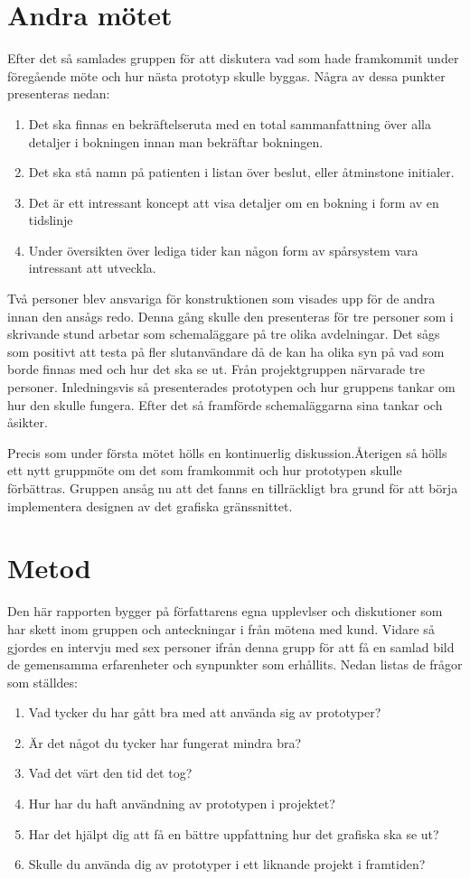 \section{Andra mötet}
Efter det  så samlades gruppen för att diskutera vad som hade framkommit under föregående möte och hur nästa prototyp skulle byggas. Några av dessa punkter  presenteras nedan:
\begin{enumerate}
	\item Det ska finnas en bekräftelseruta med en total sammanfattning över alla detaljer i bokningen innan man 	 			  	  bekräftar bokningen.
 	\item Det ska stå namn på patienten i listan över beslut, eller åtminstone initialer.
 	\item Det är ett intressant koncept att visa detaljer om en bokning i form av en tidslinje
 	\item Under översikten över lediga tider kan någon form av spårsystem vara intressant att utveckla.
\end{enumerate}
Två personer blev ansvariga för konstruktionen som visades upp för de andra innan den ansågs redo. Denna gång skulle den presenteras för tre personer som i skrivande stund arbetar som schemaläggare på tre olika avdelningar. Det sågs som positivt att testa på fler slutanvändare då de kan ha olika syn på vad som borde finnas med och hur det ska se ut. Från projektgruppen närvarade tre personer. Inledningsvis så presenterades prototypen och hur gruppens tankar om hur den skulle fungera. Efter det så framförde schemaläggarna sina tankar och åsikter. 

Precis som under första mötet hölls en kontinuerlig diskussion.Återigen så hölls ett nytt gruppmöte om det som framkommit och hur prototypen skulle förbättras. Gruppen ansåg nu att det fanns en tillräckligt bra grund för att börja implementera designen av det grafiska gränssnittet.
  
\section{Metod}
Den här rapporten bygger på författarens egna upplevlser och diskutioner som har skett inom gruppen och anteckningar i från mötena med kund. Vidare så gjordes en intervju med sex personer ifrån denna grupp för att få en samlad bild de gemensamma erfarenheter och synpunkter som erhållits. Nedan listas de frågor som ställdes:
\begin{enumerate}
	\item Vad tycker du har gått bra med att använda sig av prototyper?
 	\item Är det något du tycker har fungerat mindra bra?
 	\item Vad det värt den tid det tog?
 	\item Hur har du haft användning av prototypen i projektet?
 	\item Har det hjälpt dig att få en bättre uppfattning hur det grafiska ska se ut?
 	\item Skulle du använda dig av prototyper i ett liknande projekt i framtiden? 
\end{enumerate}
 

